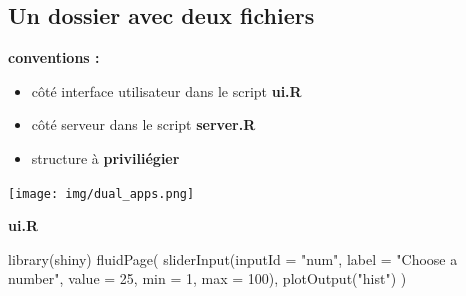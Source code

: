 \documentclass[
]{article}
\newenvironment{Shaded}{\begin{snugshade}}{\end{snugshade}}
\newcommand{\AttributeTok}[1]{\textcolor[rgb]{0.77,0.63,0.00}{#1}}
\newcommand{\ControlFlowTok}[1]{\textcolor[rgb]{0.13,0.29,0.53}{\textbf{#1}}}
\newcommand{\DecValTok}[1]{\textcolor[rgb]{0.00,0.00,0.81}{#1}}
\newcommand{\FunctionTok}[1]{\textcolor[rgb]{0.00,0.00,0.00}{#1}}
\newcommand{\NormalTok}[1]{#1}
\newcommand{\OtherTok}[1]{\textcolor[rgb]{0.56,0.35,0.01}{#1}}
\newcommand{\SpecialCharTok}[1]{\textcolor[rgb]{0.00,0.00,0.00}{#1}}
\newcommand{\StringTok}[1]{\textcolor[rgb]{0.31,0.60,0.02}{#1}}
\providecommand{\tightlist}{%
  \setlength{\itemsep}{0pt}\setlength{\parskip}{0pt}}
\begin{document}
\begin{Shaded}
\end{Shaded}

\hypertarget{un-dossier-avec-deux-fichiers}{%
\subsection{Un dossier avec deux
fichiers}\label{un-dossier-avec-deux-fichiers}}

\textbf{conventions :}

\begin{itemize}
\tightlist
\item
  côté interface utilisateur dans le script \textbf{ui.R}
\item
  côté serveur dans le script \textbf{server.R}
\item
  structure à \textbf{priviliégier}
\end{itemize}

\texttt{[image: img/dual\_apps.png]}

\textbf{ui.R}

\begin{Shaded}
\begin{Highlighting}[]
\FunctionTok{library}\NormalTok{(shiny)}
\FunctionTok{fluidPage}\NormalTok{(}
  \FunctionTok{sliderInput}\NormalTok{(}\AttributeTok{inputId =} \StringTok{"num"}\NormalTok{, }\AttributeTok{label =} \StringTok{"Choose a number"}\NormalTok{, }
              \AttributeTok{value =} \DecValTok{25}\NormalTok{, }\AttributeTok{min =} \DecValTok{1}\NormalTok{, }\AttributeTok{max =} \DecValTok{100}\NormalTok{),  }
  \FunctionTok{plotOutput}\NormalTok{(}\StringTok{"hist"}\NormalTok{)}
\NormalTok{)}
\end{Highlighting}
\end{Shaded}
\end{document}

